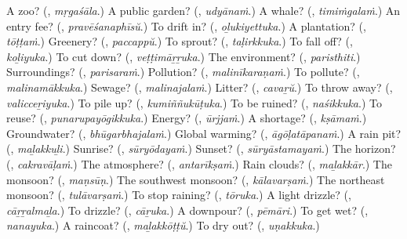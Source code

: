 \begin{tcolorbox}[breakable,colback=teal!4,colframe=teal!35!black,title={Before you move on}]
A zoo? (\textbf{}, \emph{mṛgaśāla}.) A public garden? (\textbf{}, \emph{udyānaṁ}.) A whale? (\textbf{}, \emph{timiṁgalaṁ}.) An entry fee? (\textbf{}, \emph{pravēśanaphīsŭ}.) To drift in? (\textbf{}, \emph{oḻukiyettuka}.) A plantation? (\textbf{}, \emph{tōṭṭaṁ}.) Greenery? (\textbf{}, \emph{paccappŭ}.) To sprout? (\textbf{}, \emph{taḷirkkuka}.) To fall off? (\textbf{}, \emph{koḻiyuka}.) To cut down? (\textbf{}, \emph{veṭṭimāṟṟuka}.) The environment? (\textbf{}, \emph{paristhiti}.) Surroundings? (\textbf{}, \emph{parisaraṁ}.) Pollution? (\textbf{}, \emph{malinīkaraṇaṁ}.) To pollute? (\textbf{}, \emph{malinamākkuka}.) Sewage? (\textbf{}, \emph{malinajalaṁ}.) Litter? (\textbf{}, \emph{cavaṟŭ}.) To throw away? (\textbf{}, \emph{valicceṟiyuka}.) To pile up? (\textbf{}, \emph{kumiññukūṭuka}.) To be ruined? (\textbf{}, \emph{naśikkuka}.) To reuse? (\textbf{}, \emph{punarupayōgikkuka}.) Energy? (\textbf{}, \emph{ūrjjaṁ}.) A shortage? (\textbf{}, \emph{kṣāmaṁ}.) Groundwater? (\textbf{}, \emph{bhūgarbhajalaṁ}.) Global warming? (\textbf{}, \emph{āgōḷatāpanaṁ}.) A rain pit? (\textbf{}, \emph{maḻakkuḻi}.) Sunrise? (\textbf{}, \emph{sūryōdayaṁ}.) Sunset? (\textbf{}, \emph{sūryāstamayaṁ}.) The horizon? (\textbf{}, \emph{cakravāḷaṁ}.) The atmosphere? (\textbf{}, \emph{antarīkṣaṁ}.) Rain clouds? (\textbf{}, \emph{maḻakkār}.) The monsoon? (\textbf{}, \emph{maṇsūṇ}.) The southwest monsoon? (\textbf{}, \emph{kālavarṣaṁ}.) The northeast monsoon? (\textbf{}, \emph{tulāvarṣaṁ}.) To stop raining? (\textbf{}, \emph{tōruka}.) A light drizzle? (\textbf{}, \emph{cāṟṟalmaḻa}.) To drizzle? (\textbf{}, \emph{cāṟuka}.) A downpour? (\textbf{}, \emph{pēmāri}.) To get wet? (\textbf{}, \emph{nanayuka}.) A raincoat? (\textbf{}, \emph{maḻakkōṭṭŭ}.) To dry out? (\textbf{}, \emph{uṇakkuka}.)
\end{tcolorbox}
